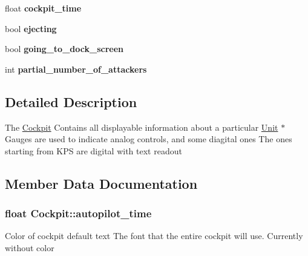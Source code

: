 \begin{DoxyCompactItemize}
\item 
float {\bfseries cockpit\+\_\+time}\hypertarget{classCockpit_aafb1f1b671707c6de53be28709ed83c8}{}\label{classCockpit_aafb1f1b671707c6de53be28709ed83c8}

\item 
bool {\bfseries ejecting}\hypertarget{classCockpit_aaa7a00f2f9388f7d5858e9b99d3ece77}{}\label{classCockpit_aaa7a00f2f9388f7d5858e9b99d3ece77}

\item 
bool {\bfseries going\+\_\+to\+\_\+dock\+\_\+screen}\hypertarget{classCockpit_a7ef625751f8844ad1d60f225d95b6535}{}\label{classCockpit_a7ef625751f8844ad1d60f225d95b6535}

\item 
int {\bfseries partial\+\_\+number\+\_\+of\+\_\+attackers}\hypertarget{classCockpit_aaec23a67f7a0557f857d46f42be986f8}{}\label{classCockpit_aaec23a67f7a0557f857d46f42be986f8}

\end{DoxyCompactItemize}


\subsection{Detailed Description}
The \hyperlink{classCockpit}{Cockpit} Contains all displayable information about a particular \hyperlink{classUnit}{Unit} $\ast$ Gauges are used to indicate analog controls, and some diagital ones The ones starting from K\+PS are digital with text readout 

\subsection{Member Data Documentation}
\subsubsection[{\texorpdfstring{autopilot\+\_\+time}{autopilot_time}}]{\setlength{\rightskip}{0pt plus 5cm}float Cockpit\+::autopilot\+\_\+time\hspace{0.3cm}{\ttfamily [protected]}}\hypertarget{classCockpit_af9bafcbbecb751c2d3529f2a1f632a69}{}\label{classCockpit_af9bafcbbecb751c2d3529f2a1f632a69}
Color of cockpit default text The font that the entire cockpit will use. Currently without color 

